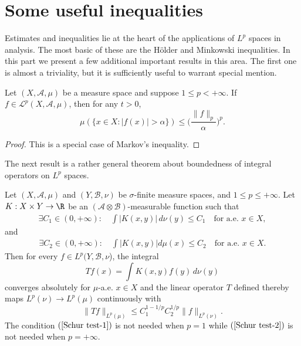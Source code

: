 \section{Some useful inequalities}
Estimates and inequalities lie at the heart of the applications of $L^p$ spaces in analysis. The most basic of these are the H\"older and Minkowski inequalities. In this part we present a few additional important results in this area. The first one is almost a triviality, but it is sufficiently useful to warrant special mention.
\begin{proposition}
Let $(X,\mathcal{A},\mu)$ be a measure space and suppose $1\leq p<+\infty$. If $f\in\mathcal{L}^p(X,\mathcal{A},\mu)$, then for any $t>0$,
\[\mu(\{x\in X:|f(x)|>\alpha\})\leq\Big(\frac{\|f\|_p}{\alpha}\Big)^p.\] 
\end{proposition}
\begin{proof}
This is a special case of Markov's inequality.
\end{proof}
The next result is a rather general theorem about boundedness of integral operators on $L^p$ spaces.
\begin{theorem}\label{Schur test}
Let $(X,\mathcal{A},\mu)$ and $(Y,\mathcal{B},\nu)$ be $\sigma$-finite measure spaces, and $1\leq p\leq+\infty$. Let $K:X\times Y\to\R$ be an $(\mathcal{A}\otimes\mathcal{B})$-measurable function such that
\begin{align}\label{Schur test-1}
\exists C_1\in(0,+\infty):\quad \int|K(x,y)|\,d\nu(y)\leq C_1\quad \text{for a.e. $x\in X$},
\end{align}
and
\begin{align}\label{Schur test-2}
\exists C_2\in(0,+\infty):\quad\int|K(x,y)|d\mu(x)\leq C_2\quad \text{for a.e. $x\in X$}.
\end{align}
Then for every $f\in L^p(Y,\mathcal{B},\nu$), the integral
\[Tf(x)=\int K(x,y)f(y)\,d\nu(y)\]
converges absolutely for $\mu$-a.e. $x\in X$ and the linear operator $T$ defined thereby maps $L^p(\nu)\to L^p(\mu)$ continuously with
\[\|Tf\|_{L^p(\mu)}\leq C_1^{1-1/p}C_2^{1/p}\|f\|_{L^p(\nu)}.\]
The condition $(\ref{Schur test-1})$ is not needed when $p=1$ while $(\ref{Schur test-2})$ is not needed when $p=+\infty$.
\end{theorem}
